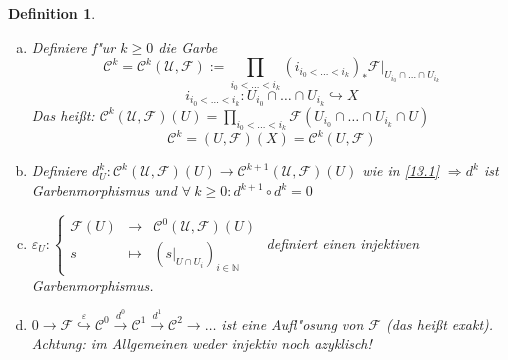 \documentclass[paper = A4, fontsize=12pt, numbers=noendperiod, chapterprefix=true]{scrbook}
\theoremstyle{break}
\newtheorem{Def}{Definition}[section]
\theoremstyle{nonumberbreak}
\theoremstyle{nonumberplain}
\newcommand{\Prod}{\prod\limits}
\newcommand{\N}{\mathbb{N}}
\newcommand{\calC}{\mathcal{C}}
\newcommand{\calF}{\mathcal{F}}
\newcommand{\calU}{\mathcal{U}}
\begin{document}
\begin{Def}\label{13.3}\begin{enumerate}[a)]
\item
	Definiere f"ur $k \ge 0$ die Garbe
		\[ \calC^k = \calC^k(\calU, \calF) := \prod_{i_0 < \ldots < i_k} (i_{i_0 < \ldots < i_k})_* \calF|_{U_{i_0} \cap \ldots \cap U_{i_k}} \]
		\[ i_{i_0 < \ldots < i_k} : U_{i_0} \cap \ldots \cap U_{i_k} \hookrightarrow X \]
	Das hei\ss t: $\calC^k(\calU, \calF)(U) = \Prod_{i_0 < \ldots < i_k} \calF(U_{i_0} \cap \ldots \cap U_{i_k} \cap U)$
		\[ \calC^k = (U, \calF)(X) = \calC^k(U, \calF) \]
\item
	Definiere $d_U^k: \calC^k(\calU, \calF)(U) \to \calC^{k+1}(\calU, \calF)(U)$ wie in \ref{13.1} $\Rightarrow d^k$ ist Garbenmorphismus und $\forall \ k \ge 0: d^{k+1} \circ d^k = 0$
\item
	$\varepsilon_U: \left\{ \begin{array}{ccc} \calF(U) &\to& \calC^0(\calU, \calF)(U) \\ s &\mapsto& (s|_{U \cap U_i})_{i \in \N} \end{array}\right.$ definiert einen injektiven Garbenmorphismus.
\item
	$0 \to \calF \overset{\varepsilon}{\hookrightarrow} \calC^0 \xrightarrow{d^0} \calC^1 \xrightarrow{d^1} \calC^2 \to \ldots$ ist eine Aufl"osung von $\calF$ (das hei\ss t exakt). \emph{Achtung:} im Allgemeinen weder injektiv noch azyklisch!
\end{enumerate}\end{Def}
\end{document}

